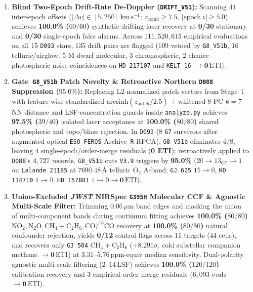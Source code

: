 \documentclass[twocolumn,10pt]{article}
\begin{document}
\begin{enumerate}
  \item \textbf{Blind Two-Epoch Drift-Rate De-Doppler (\texttt{DRIFT\_V51}):} Scanning $41$ inter-epoch offsets ($|\Delta v| \in [5, 250]\,\mathrm{km\,s^{-1}}$; $z_{\mathrm{comb}}\ge 7.5$, $|\mathrm{epoch\,}z|\ge 5.0$) achieves \textbf{100.0\% ($60/60$)} synthetic drifting-laser recovery at \textbf{0/30} stationary and \textbf{0/30} single-epoch false alarms. Across $111{,}520{,}615$ empirical evaluations on all 15 \texttt{D093} stars, $135$ drift pairs are flagged ($109$ vetoed by \texttt{G8\_V51b}, $16$ telluric/airglow, $5$ M-dwarf molecular, $3$ chromospheric, $2$ chance photospheric noise coincidences on \texttt{HD\,217107} and \texttt{KELT-16} $\rightarrow \mathbf{0\,\mathrm{ETI}}$).
  \item \textbf{Gate~\texttt{G8\_V51b} Patch Novelty \& Retroactive Northern \texttt{D088} Suppression ($95.0\%$):} Replacing L2-normalized patch vectors from Stage~1 with feature-wise standardized $\mathrm{arcsinh}(z_{\mathrm{patch}}/2.5)$ + whitened $8$-PC $k=7$-NN distance and LSF-concentration guards inside \texttt{analyze.py} achieves \textbf{97.5\% ($39/40$)} isolated laser acceptance at \textbf{100.0\% ($80/80$)} shared photospheric and topo/blaze rejection. In \texttt{D093} ($8$ \texttt{G7} survivors after augmented optical \texttt{ESO\_FEROS} Archive~\texttt{R} RPCA), \texttt{G8\_V51b} eliminates $4/8$, leaving $4$ single-epoch/order-merge residuals (\textbf{0 ETI}); retroactively applied to \texttt{D088}'s $4{,}727$ records, \texttt{G8\_V51b} cuts \texttt{V3.9} triggers by \textbf{95.0\%} ($20 \rightarrow 13_{\mathrm{G7}} \rightarrow 1$ on \texttt{Lalande\,21185} at $7690.48\,\text{\AA}$ telluric $\mathrm{O_2}$ A-band; \texttt{GJ\,625} $15\rightarrow 0$, \texttt{HD\,114710} $1\rightarrow 0$, \texttt{HD\,157881} $1\rightarrow 0 \rightarrow \mathbf{0\,\mathrm{ETI}}$).
  \item \textbf{Union-Excluded \textit{JWST} NIRSpec \texttt{G395H} Molecular CCF \& Agnostic Multi-Scale Filter:} Trimming $0.06\,\mu\text{m}$ band edges and masking the union of multi-component bands during continuum fitting achieves \textbf{100.0\% ($80/80$)} $\mathrm{NO_2, N_2O, CH_4+C_2H_6, CO/^{13}CO}$ recovery at \textbf{100.0\% ($80/80$)} natural confounder rejection, yields \textbf{0/12} control flags across 11 targets ($44$ cells), and recovers only \texttt{GJ\,504} $\mathrm{CH_4+C_2H_6}$ ($+8.291\sigma$, cold substellar companion methane $\rightarrow \mathbf{0\,\mathrm{ETI}}$) at $3.31\text{--}5.76\,\mathrm{ppm\text{-}equiv}$ median sensitivity. Dual-polarity agnostic multi-scale filtering ($2\text{--}14\,\mathrm{LSF}$) achieves \textbf{100.0\% ($120/120$)} calibration recovery and $3$ empirical order-merge residuals ($6{,}093$ evals $\rightarrow \mathbf{0\,\mathrm{ETI}}$).

\end{enumerate}
\end{document}
